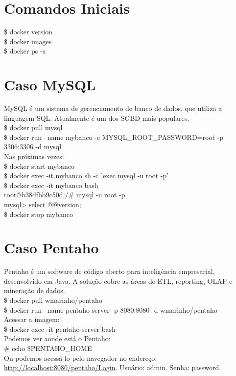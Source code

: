 \documentclass[a4paper,11pt]{article}
\begin{document}
	
\maketitle %
\thispagestyle{fancy} %
	
\section*{Comandos Iniciais}
{\ttfamily\$ docker version} \\
{\ttfamily\$ docker images} \\
{\ttfamily\$ docker ps -a}

\section{Caso MySQL}
MySQL é um sistema de gerenciamento de banco de dados, que utiliza a linguagem SQL. Atualmente é um dos SGBD mais populares. \\
{\ttfamily\$ docker pull mysql} \\
{\ttfamily\$ docker run --name mybanco -e MYSQL\_ROOT\_PASSWORD=root -p 3306:3306 -d mysql} \\[2mm]
Nas próximas vezes: \\
{\ttfamily\$ docker start mybanco} \\
{\ttfamily\$ docker exec -it mybanco sh -c 'exec mysql -u root -p'} \\
{\ttfamily\$ docker exec -it mybanco bash} \\
{\ttfamily root@b38dfbb9c50d:/\# mysql -u root -p} \\
{\ttfamily mysql> select @@version;} \\
{\ttfamily\$ docker stop mybanco}

\section{Caso Pentaho}
Pentaho é um software de código aberto para inteligência empresarial, desenvolvido em Java. A solução cobre as àreas de ETL, reporting, OLAP e mineração de dados. \\
{\ttfamily\$ docker pull wmarinho/pentaho} \\
{\ttfamily\$ docker run --name pentaho-server -p 8080:8080 -d wmarinho/pentaho} \\[2mm]
Acessar a imagem: \\
{\ttfamily\$ docker exec -it pentaho-server bash} \\[2mm]
Podemos ver aonde está o Pentaho: \\
{\ttfamily\# echo \$PENTAHO\_HOME} \\[2mm]
Ou podemos acessá-lo pelo navegador no endereço: \url{http://localhost:8080/pentaho/Login}. Usuário: admin. Senha: password.
\end{document}

